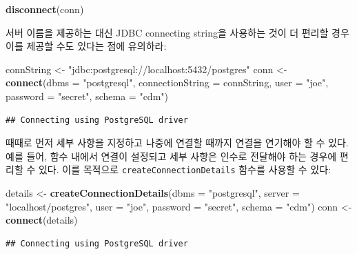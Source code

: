 \documentclass[11pt]{book}
\newenvironment{Shaded}{\begin{snugshade}}{\end{snugshade}}
\newcommand{\KeywordTok}[1]{\textcolor[rgb]{0.13,0.29,0.53}{\textbf{#1}}}
\newcommand{\DataTypeTok}[1]{\textcolor[rgb]{0.13,0.29,0.53}{#1}}
\newcommand{\StringTok}[1]{\textcolor[rgb]{0.31,0.60,0.02}{#1}}
\newcommand{\NormalTok}[1]{#1}
\theoremstyle{definition}
\theoremstyle{definition}
\theoremstyle{definition}
\theoremstyle{remark}
\begin{document}
\begin{Shaded}
\begin{Highlighting}[]
\KeywordTok{disconnect}\NormalTok{(conn)}
\end{Highlighting}
\end{Shaded}

서버 이름을 제공하는 대신 JDBC connecting string을 사용하는 것이 더
편리할 경우 이를 제공할 수도 있다는 점에 유의하라:

\begin{Shaded}
\begin{Highlighting}[]
\NormalTok{connString <-}\StringTok{ "jdbc:postgresql://localhost:5432/postgres"}
\NormalTok{conn <-}\StringTok{ }\KeywordTok{connect}\NormalTok{(}\DataTypeTok{dbms =} \StringTok{"postgresql"}\NormalTok{,}
                \DataTypeTok{connectionString =}\NormalTok{ connString,}
                \DataTypeTok{user =} \StringTok{"joe"}\NormalTok{,}
                \DataTypeTok{password =} \StringTok{"secret"}\NormalTok{,}
                \DataTypeTok{schema =} \StringTok{"cdm"}\NormalTok{)}
\end{Highlighting}
\end{Shaded}

\begin{verbatim}
## Connecting using PostgreSQL driver
\end{verbatim}

때때로 먼저 세부 사항을 지정하고 나중에 연결할 때까지 연결을 연기해야 할
수 있다. 예를 들어, 함수 내에서 연결이 설정되고 세부 사항은 인수로
전달해야 하는 경우에 편리할 수 있다. 이를 목적으로
\texttt{createConnectionDetails} 함수를 사용할 수 있다:

\begin{Shaded}
\begin{Highlighting}[]
\NormalTok{details <-}\StringTok{ }\KeywordTok{createConnectionDetails}\NormalTok{(}\DataTypeTok{dbms =} \StringTok{"postgresql"}\NormalTok{,}
                                   \DataTypeTok{server =} \StringTok{"localhost/postgres"}\NormalTok{,}
                                   \DataTypeTok{user =} \StringTok{"joe"}\NormalTok{,}
                                   \DataTypeTok{password =} \StringTok{"secret"}\NormalTok{,}
                                   \DataTypeTok{schema =} \StringTok{"cdm"}\NormalTok{)}
\NormalTok{conn <-}\StringTok{ }\KeywordTok{connect}\NormalTok{(details)}
\end{Highlighting}
\end{Shaded}

\begin{verbatim}
## Connecting using PostgreSQL driver
\end{verbatim}
\end{document}
